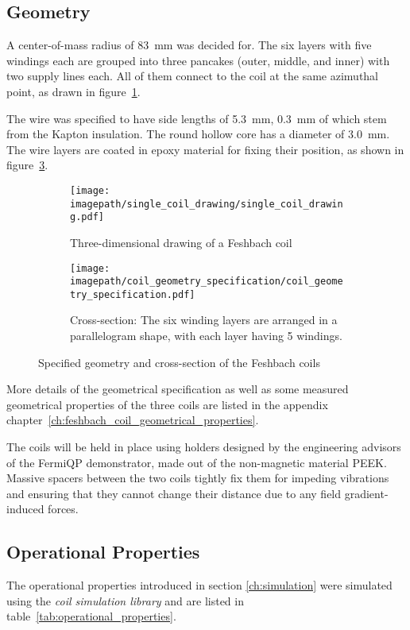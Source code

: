 \subsection*{Geometry}
A center-of-mass radius of \SI{83}{\milli\meter} was decided for. The six layers with five windings each are grouped into three pancakes (outer, middle, and inner) with two supply lines each. All of them connect to the coil at the same azimuthal point, as drawn in figure~\ref{fig:single_coil_drawing}. 

The wire was specified to have side lengths of \SI{5.3}{\milli\meter}, \SI{0.3}{\milli\meter} of which stem from the Kapton insulation. The round hollow core has a diameter of \SI{3.0}{\milli\meter}. The wire layers are coated in epoxy material for fixing their position, as shown in figure~\ref{fig:coil_geometry_specification}.

\begin{figure}
    \centering
    \begin{subfigure}[t]{0.48\textwidth}
        \centering
        \texttt{[image: \\imagepath/single\_coil\_drawing/single\_coil\_drawing.pdf]}
        \caption{Three-dimensional drawing of a Feshbach coil}
        \label{fig:single_coil_drawing}
    \end{subfigure}
    \hspace{0.03\textwidth}
    \begin{subfigure}[t]{0.48\textwidth}
        \centering
        \texttt{[image: \\imagepath/coil\_geometry\_specification/coil\_geometry\_specification.pdf]}
        \caption{Cross-section: The six winding layers are arranged in a parallelogram shape, with each layer having 5 windings.}
        \label{fig:coil_geometry_specification}
    \end{subfigure}
    \caption{Specified geometry and cross-section of the Feshbach coils}
\end{figure}

More details of the geometrical specification as well as some measured geometrical properties of the three coils are listed in the appendix chapter~\ref{ch:feshbach_coil_geometrical_properties}.

The coils will be held in place using holders designed by the engineering advisors of the FermiQP demonstrator, made out of the non-magnetic material PEEK. Massive spacers between the two coils tightly fix them for impeding vibrations and ensuring that they cannot change their distance due to any field gradient-induced forces.

\subsection*{Operational Properties}
The operational properties introduced in section \ref{ch:simulation} were simulated using the \textit{coil simulation library} and are listed in table~\ref{tab:operational_properties}.


